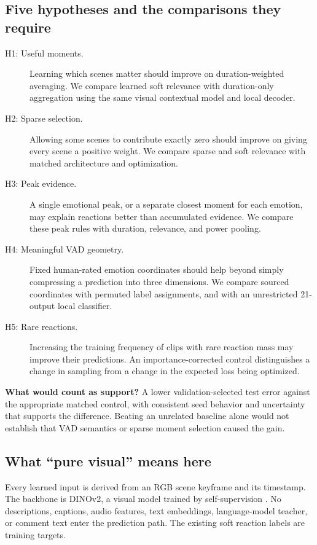 \documentclass[11pt,a4paper]{article}
\begin{document}
\subsection{Five hypotheses and the comparisons they require}
\begin{description}
\item[H1: Useful moments.] Learning which scenes matter should improve on duration-weighted averaging. We compare learned soft relevance with duration-only aggregation using the same visual contextual model and local decoder.
\item[H2: Sparse selection.] Allowing some scenes to contribute exactly zero should improve on giving every scene a positive weight. We compare sparse and soft relevance with matched architecture and optimization.
\item[H3: Peak evidence.] A single emotional peak, or a separate closest moment for each emotion, may explain reactions better than accumulated evidence. We compare these peak rules with duration, relevance, and power pooling.
\item[H4: Meaningful VAD geometry.] Fixed human-rated emotion coordinates should help beyond simply compressing a prediction into three dimensions. We compare sourced coordinates with permuted label assignments, and with an unrestricted 21-output local classifier.
\item[H5: Rare reactions.] Increasing the training frequency of clips with rare reaction mass may improve their predictions. An importance-corrected control distinguishes a change in sampling from a change in the expected loss being optimized.
\end{description}

\textbf{What would count as support?} A lower validation-selected test error against the appropriate matched control, with consistent seed behavior and uncertainty that supports the difference. Beating an unrelated baseline alone would not establish that VAD semantics or sparse moment selection caused the gain.

\subsection{What ``pure visual'' means here}
Every learned input is derived from an RGB scene keyframe and its timestamp. The backbone is DINOv2, a visual model trained by self-supervision \cite{dinov2}. No descriptions, captions, audio features, text embeddings, language-model teacher, or comment text enter the prediction path. The existing soft reaction labels are training targets.
\end{document}
